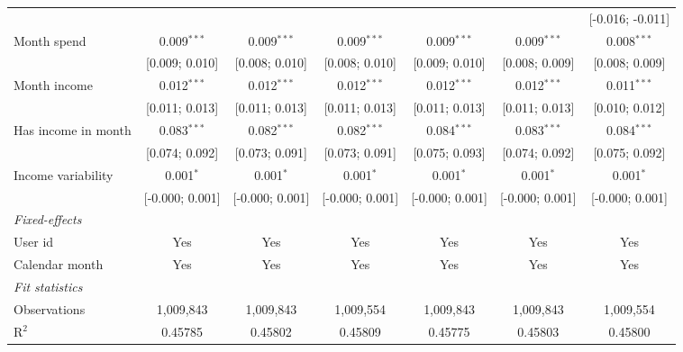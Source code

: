 \begin{table}[htbp]
\begin{threeparttable}[b]
\begin{tabular}{lcccccc}
                                        &                 &                 &                 &                  &                  & [-0.016; -0.011]\\   
         Month spend                    & 0.009$^{***}$   & 0.009$^{***}$   & 0.009$^{***}$   & 0.009$^{***}$    & 0.009$^{***}$    & 0.008$^{***}$\\   
                                        & [0.009; 0.010]  & [0.008; 0.010]  & [0.008; 0.010]  & [0.009; 0.010]   & [0.008; 0.009]   & [0.008; 0.009]\\   
         Month income                   & 0.012$^{***}$   & 0.012$^{***}$   & 0.012$^{***}$   & 0.012$^{***}$    & 0.012$^{***}$    & 0.011$^{***}$\\   
                                        & [0.011; 0.013]  & [0.011; 0.013]  & [0.011; 0.013]  & [0.011; 0.013]   & [0.011; 0.013]   & [0.010; 0.012]\\   
         Has income in month            & 0.083$^{***}$   & 0.082$^{***}$   & 0.082$^{***}$   & 0.084$^{***}$    & 0.083$^{***}$    & 0.084$^{***}$\\   
                                        & [0.074; 0.092]  & [0.073; 0.091]  & [0.073; 0.091]  & [0.075; 0.093]   & [0.074; 0.092]   & [0.075; 0.092]\\   
         Income variability             & 0.001$^{*}$     & 0.001$^{*}$     & 0.001$^{*}$     & 0.001$^{*}$      & 0.001$^{*}$      & 0.001$^{*}$\\   
                                        & [-0.000; 0.001] & [-0.000; 0.001] & [-0.000; 0.001] & [-0.000; 0.001]  & [-0.000; 0.001]  & [-0.000; 0.001]\\   
         \midrule
         \emph{Fixed-effects}\\
         User id                        & Yes             & Yes             & Yes             & Yes              & Yes              & Yes\\  
         Calendar month                 & Yes             & Yes             & Yes             & Yes              & Yes              & Yes\\  
         \midrule
         \emph{Fit statistics}\\
         Observations                   & 1,009,843       & 1,009,843       & 1,009,554       & 1,009,843        & 1,009,843        & 1,009,554\\  
         R$^2$                          & 0.45785         & 0.45802         & 0.45809         & 0.45775          & 0.45803          & 0.45800\\  

\end{tabular}
\end{threeparttable}
\end{table}
